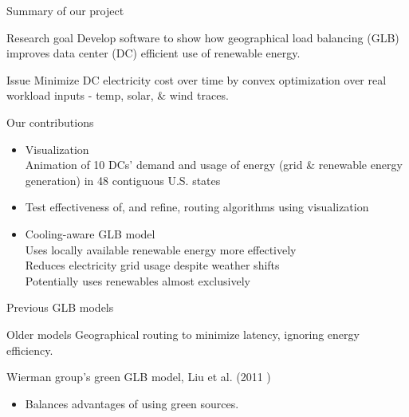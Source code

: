 \documentclass[xcolor=dvipsnames]{beamer}
\begin{document}
\begin{frame}{Summary of our project}

	\begin{block}{Research goal}  
	Develop software to show how geographical load balancing (GLB) improves data center (DC) efficient use of renewable energy.  
	\end{block}
	
	\begin{block}{Issue} 
	Minimize DC electricity cost over time by convex optimization over real workload inputs - temp, solar, \& wind traces.
	\end{block}

	\begin{block}{Our contributions} 
	\begin{itemize}
		\item{Visualization \\ 
		Animation of 10 DCs' demand and usage of energy (grid \& renewable energy generation) in 48 contiguous U.S. states}
		\item{Test effectiveness of, and refine, routing algorithms using visualization}
		\item{Cooling-aware GLB model \\
			Uses locally available renewable energy more effectively \\
			Reduces electricity grid usage despite weather shifts\\
			Potentially uses renewables almost exclusively}
	\end{itemize} 
	\end{block}

\end{frame}

\begin{frame}{Previous GLB models}

	\begin{block}{Older models}
		Geographical routing to minimize latency, ignoring energy efficiency.
	\end{block}

	\begin{block}{Wierman group's green GLB model, Liu et al. (2011 )} %
		\begin{itemize}
			\item{Balances advantages of using green sources.}
		\end{itemize}
	\end{block}  	
\end{frame}
\end{document}
